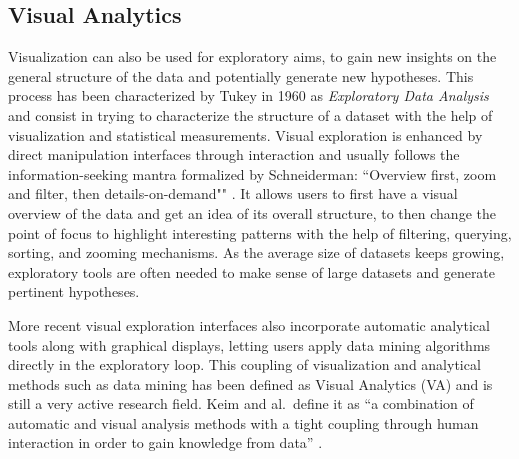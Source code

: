 \subsection{Visual Analytics}

Visualization can also be used for exploratory aims, to gain new insights on the general structure of the data and potentially generate new hypotheses.
This process has been characterized by Tukey in 1960 as \emph{Exploratory Data Analysis} \cite{tukeyExploratoryDataAnalysis1977} and consist in trying to characterize the structure of a dataset with the help of visualization and statistical measurements.
Visual exploration is enhanced by direct manipulation interfaces through interaction and usually follows the information-seeking mantra formalized by Schneiderman: ``Overview first, zoom and filter, then details-on-demand"" \cite{shneidermanEyesHaveIt1996}.
It allows users to first have a visual overview of the data and get an idea of its overall structure, to then change the point of focus to highlight interesting patterns with the help of filtering, querying, sorting, and zooming mechanisms.
As the average size of datasets keeps growing, exploratory tools are often needed to make sense of large datasets and generate pertinent hypotheses.

More recent visual exploration interfaces also incorporate automatic analytical tools along with graphical displays, letting users apply data mining algorithms directly in the exploratory loop.
This coupling of visualization and analytical methods such as data mining has been defined as Visual Analytics (VA) and is still a very active research field.
Keim and al.\ define it as ``a combination of automatic and visual analysis methods with a tight coupling through human interaction in order to gain knowledge from data'' \cite{keimVisualAnalyticsDefinition2008}.

